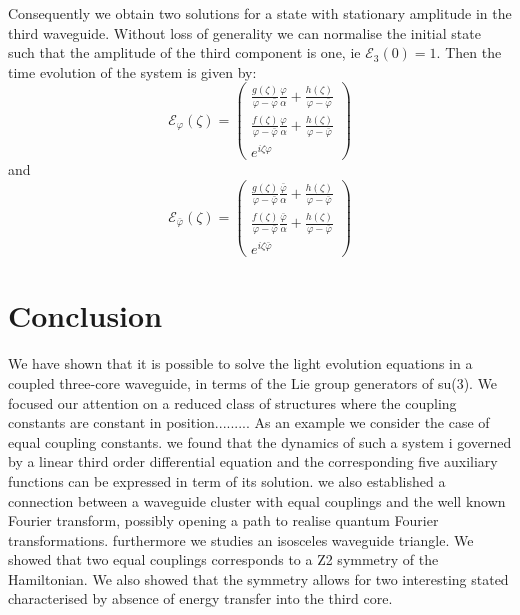 \documentclass[9pt,twocolumn,twoside]{osajnl}
\begin{document}
Consequently we obtain two solutions for a state with stationary amplitude in the third waveguide.
 Without loss of generality we can normalise the initial state such that the amplitude of the third component is one, ie $\mathcal{E}_3(0)=1$.
 Then the time evolution of the system is given by:
\begin{equation}
\mathcal{E}_{\varphi}(\zeta)=\left( \begin{array}{c}
\frac{g(\zeta)}{\varphi -\bar{\varphi}}\frac{\varphi}{\alpha}+\frac{h(\zeta)}{\varphi -\bar{\varphi}} \\
\frac{f(\zeta)}{\varphi -\bar{\varphi}}\frac{\varphi}{\alpha}+\frac{h(\zeta)}{\varphi -\bar{\varphi}} \\
e^{i\zeta\varphi}
\end{array} \right)	
\end{equation}
and
\begin{equation}
\mathcal{E}_{\bar{\varphi}}(\zeta)=\left( \begin{array}{c}
\frac{g(\zeta)}{\varphi -\bar{\varphi}}\frac{\bar{\varphi}}{\alpha}+\frac{h(\zeta)}{\varphi -\bar{\varphi}} \\
\frac{f(\zeta)}{\varphi -\bar{\varphi}}\frac{\bar{\varphi}}{\alpha}+\frac{h(\zeta)}{\varphi -\bar{\varphi}} \\
e^{i\zeta\bar{\varphi}}
\end{array} \right)	
\end{equation}




\section{Conclusion}
We have shown that it is possible to solve the light evolution
equations in a coupled three-core waveguide, in terms of
the Lie group generators of su(3). We focused our attention on a
reduced class of structures where the coupling constants
are constant in position......... As an
example we consider the case of equal coupling constants.
we found that the dynamics of such a system i 
governed by a linear third order differential equation and the
corresponding five auxiliary functions can be expressed in term of its solution.
we also established a connection between a waveguide cluster
with equal couplings and the well known Fourier transform, possibly opening
a path to realise quantum Fourier transformations.
furthermore we studies an isosceles waveguide triangle.
We showed that two equal couplings corresponds to
a Z2 symmetry of the Hamiltonian. We also showed 
that the symmetry allows for two interesting stated
characterised by absence of energy transfer into the 
third core.









\end{document}
